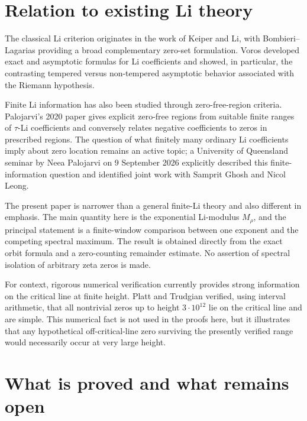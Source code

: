 \documentclass[11pt]{article}
\begin{document}
\section{Relation to existing Li theory}

The classical Li criterion originates in the work of Keiper and Li, with Bombieri--Lagarias providing a broad complementary zero-set formulation. \cite{Keiper1992,Li1997,BombieriLagarias1999} Voros developed exact and asymptotic formulas for Li coefficients and showed, in particular, the contrasting tempered versus non-tempered asymptotic behavior associated with the Riemann hypothesis. \cite{Voros2006}

Finite Li information has also been studied through zero-free-region criteria. Palojarvi's 2020 paper gives explicit zero-free regions from suitable finite ranges of \(\tau\)-Li coefficients and conversely relates negative coefficients to zeros in prescribed regions. \cite{Palojarvi2020} The question of what finitely many ordinary Li coefficients imply about zero location remains an active topic; a University of Queensland seminar by Neea Palojarvi on 9 September 2026 explicitly described this finite-information question and identified joint work with Samprit Ghosh and Nicol Leong. \cite{Palojarvi2026}

The present paper is narrower than a general finite-Li theory and also different in emphasis. The main quantity here is the exponential Li-modulus \(M_\rho\), and the principal statement is a finite-window comparison between one exponent and the competing spectral maximum. The result is obtained directly from the exact orbit formula and a zero-counting remainder estimate. No assertion of spectral isolation of arbitrary zeta zeros is made.

For context, rigorous numerical verification currently provides strong information on the critical line at finite height. Platt and Trudgian verified, using interval arithmetic, that all nontrivial zeros up to height \(3\cdot10^{12}\) lie on the critical line and are simple. \cite{PlattTrudgian2021} This numerical fact is not used in the proofs here, but it illustrates that any hypothetical off-critical-line zero surviving the presently verified range would necessarily occur at very large height.

\section{What is proved and what remains open}
\end{document}
